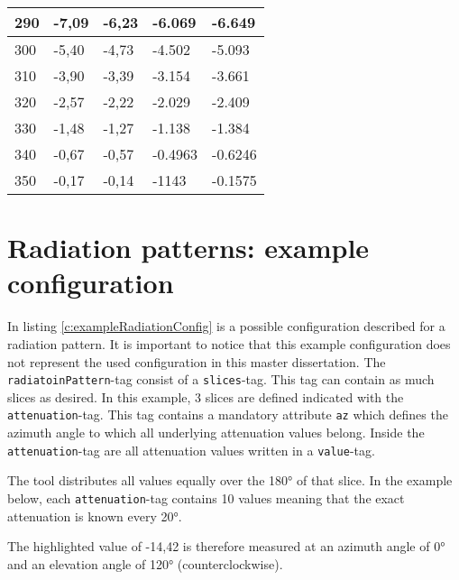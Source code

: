 \begin{table*}[!ht]
\begin{tabular}{|l|l|l|l|l|}
290 & -7,09 & -6,23 & -6.069 & -6.649 \\ \hline
300 & -5,40 & -4,73 & -4.502 & -5.093 \\ \hline
310 & -3,90 & -3,39 & -3.154 & -3.661 \\ \hline
320 & -2,57 & -2,22 & -2.029 & -2.409 \\ \hline
330 & -1,48 & -1,27 & -1.138 & -1.384 \\ \hline
340 & -0,67 & -0,57 & -0.4963 & -0.6246 \\ \hline
350 & -0,17 & -0,14 & -1143 & -0.1575 \\ \hline
\end{tabular}
\label{tab:datasheetRadiation}
\end{table*}



\chapter{Radiation patterns: example configuration}
\label{ch:radpatexampleconfig}

In listing \ref{c:exampleRadiationConfig} is a possible configuration described for a radiation pattern.
It is important to notice that this example configuration does not represent the used configuration in this master dissertation.
The \verb|radiatoinPattern|-tag consist of a \verb|slices|-tag. This tag can contain as much slices as desired.
In this example, 3 slices are defined indicated with the \verb|attenuation|-tag. This tag contains a mandatory attribute \verb|az| 
which defines the azimuth angle to which all underlying attenuation values belong.
Inside the \verb|attenuation|-tag are all attenuation values written in a \verb|value|-tag.

The tool distributes all values equally over the \ang{180} of that slice. In the example below, each \verb|attenuation|-tag contains 10 values
meaning that the exact attenuation is known every \ang{20}.

The highlighted value of -14,42 is therefore measured at an azimuth angle of \ang{0} and an elevation angle of \ang{120} (counterclockwise).

